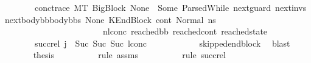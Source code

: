\begin{isabellebody}
\ \ \ \ \ \ \ \ conc{\isacharunderscore}{\kern0pt}trace{\isacharcolon}{\kern0pt}\ {\isachardoublequoteopen}{\isacharparenleft}{\kern0pt}M{\isacharcomma}{\kern0pt}{\isasymLambda}{\isacharcomma}{\kern0pt}{\isasymGamma}{\isacharcomma}{\kern0pt}{\isasymOmega}{\isacharcomma}{\kern0pt}T\ {\isasymturnstile}{\isacharparenleft}{\kern0pt}{\isacharparenleft}{\kern0pt}BigBlock\ None\ {\isacharbrackleft}{\kern0pt}{\isacharbrackright}{\kern0pt}\ {\isacharparenleft}{\kern0pt}Some\ {\isacharparenleft}{\kern0pt}ParsedWhile\ next{\isacharunderscore}{\kern0pt}guard\ next{\isacharunderscore}{\kern0pt}invs\ {\isacharparenleft}{\kern0pt}next{\isacharunderscore}{\kern0pt}body{\isacharunderscore}{\kern0pt}bb{\isacharhash}{\kern0pt}body{\isacharunderscore}{\kern0pt}bbs{\isacharparenright}{\kern0pt}{\isacharparenright}{\kern0pt}{\isacharparenright}{\kern0pt}\ None{\isacharparenright}{\kern0pt}{\isacharcomma}{\kern0pt}\ KEndBlock\ cont{}{\isacharcomma}{\kern0pt}\ Normal\ ns{}{\isacharprime}{\kern0pt}{\isacharprime}{\kern0pt}{\isacharparenright}{\kern0pt}\ \isanewline
\ \ \ \ \ \ \ \ \ \ \ \ \ \ \ \ \ \ \ \ \ \ \ \ {\isacharminus}{\kern0pt}n{\isasymlongrightarrow}{\isacharcircum}{\kern0pt}l{}{\isacharunderscore}{\kern0pt}conc\ {\isacharparenleft}{\kern0pt}reached{\isacharunderscore}{\kern0pt}bb{\isacharcomma}{\kern0pt}\ reached{\isacharunderscore}{\kern0pt}cont{\isacharcomma}{\kern0pt}\ reached{\isacharunderscore}{\kern0pt}state{\isacharparenright}{\kern0pt}{\isacharparenright}{\kern0pt}{\isachardoublequoteclose}\ \ \isanewline
\ \ \ \ \ \ \ \ succ{\isacharunderscore}{\kern0pt}rel{\isacharcolon}{\kern0pt}\ {\isachardoublequoteopen}{\isacharparenleft}{\kern0pt}j{\isacharprime}{\kern0pt}\ {\isacharequal}{\kern0pt}\ Suc\ {\isacharparenleft}{\kern0pt}Suc\ {\isacharparenleft}{\kern0pt}Suc\ l{}{\isacharunderscore}{\kern0pt}conc{\isacharparenright}{\kern0pt}{\isacharparenright}{\kern0pt}{\isacharparenright}{\kern0pt}\ {\isachardoublequoteclose}\ \isanewline
\ \ \ \ \ \ \ \ \isamarkupfalse%
\ skipped{\isacharunderscore}{\kern0pt}endblock\ \isamarkupfalse%
\ blast\isanewline
\ \ \ \ \ \ \isamarkupfalse%
\ {\isacharquery}{\kern0pt}thesis\isanewline
\ \ \ \ \ \ \ \ \isamarkupfalse%
\ {\isacharparenleft}{\kern0pt}rule\ assms{\isacharparenleft}{\kern0pt}{}{}{\isacharparenright}{\kern0pt}{\isacharparenright}{\kern0pt}\isanewline
\ \ \ \ \ \ \ \ \isamarkupfalse%
\ {\isacharparenleft}{\kern0pt}rule\ succ{\isacharunderscore}{\kern0pt}rel{\isacharparenright}{\kern0pt}\isanewline

\end{isabellebody}
